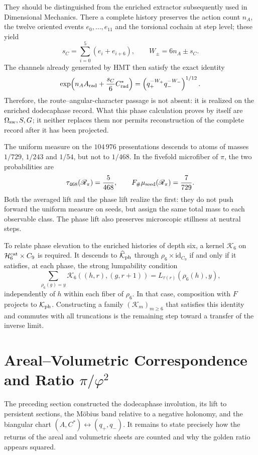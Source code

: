 They should be distinguished from the enriched extractor subsequently used in
Dimensional Mechanics. There a complete history preserves the action count
\(n_A\), the twelve oriented events \(e_0,\ldots,e_{11}\) and the torsional
cochain at step level; these yield
\[
 s_C=\sum_{i=0}^{5}(e_i+e_{i+6}),
 \qquad
 W_\pm=6n_A\pm s_C.
\]
The channels already generated by HMT then satisfy the exact identity
\[
 \exp\!\left(n_AA_{\rm rad}+\frac{s_C}{6}C^\ast_{\rm rad}\right)
 =\left(q_+^{-W_+}q_-^{-W_-}\right)^{1/12}.
\]
Therefore, the route--angular-character passage is not absent: it is realized on
the enriched dodecaphase record. What this phase calculation proves by itself
are \(\Omega_{\rm sw},S,G\); it neither replaces them nor permits reconstruction of the
complete record after it has been projected.

The uniform measure on the \(104\,976\) presentations descends to atoms
of masses \(1/729\), \(1/243\) and \(1/54\), but not to \(1/468\). In the
fivefold microfiber of \(\pi\), the two probabilities are
\[
 \tau_{468}(\mathscr R_\pi)=\frac5{468},
 \qquad
 F_\#\mu_{\rm seed}(\mathscr R_\pi)=\frac7{729}.
\]
Both the averaged lift and the phase lift realize the first: they do not
push forward the uniform measure on seeds, but assign the same total
mass to each observable class. The phase lift also preserves
microscopic stillness at neutral steps.

To relate phase elevation to the enriched histories of
depth six, a kernel \(\mathcal K_6\) on
\(\mathcal H_6^{\rm cat}\times C_9\) is required. It descends to
\(\widehat{\mathcal K}_{\rm ph}\) through
\(\rho_6\times\mathrm{id}_{C_9}\) if and only if it satisfies, at each phase, the
strong lumpability condition
\[
 \sum_{\rho_6(g)=y}\mathcal K_6((h,r),(g,r+1))
 =L_{\tau(r)}(\rho_6(h),y),
\]
independently of \(h\) within each fiber of \(\rho_6\). In that case,
composition with \(F\) projects to \(\mathcal K_{\rm ph}\). Constructing
a family \((\mathcal K_m)_{m\geq6}\) that satisfies this identity and
commutes with all truncations is the remaining step toward a
transfer of the inverse limit.


\section{Areal--Volumetric Correspondence and Ratio $\pi /\varphi ^2$}
\label{p12-83-c16-s3:sec:bisagra-hojas-pi-phi2}

The preceding section constructed the dodecaphase involution, its lift to persistent sections, the Möbius band relative to a negative holonomy, and the biangular chart \((A,C^*)\leftrightarrow(q_+,q_-)\). It remains to state precisely how the returns of the areal and volumetric sheets are counted and why the golden ratio appears squared.

